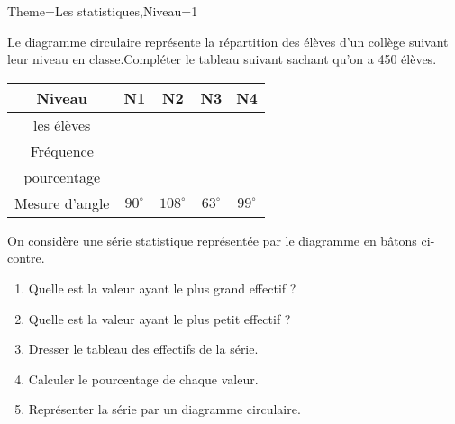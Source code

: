 \documentclass[a4paper,12pt]{article}
\begin{document}
\begin{Maquette}[Fiche]{Theme=Les statistiques,Niveau=1}
\begin{exercice}
\begin{minipage}{0.6\linewidth}
Le diagramme circulaire représente la répartition des élèves d'un collège suivant leur niveau en classe.Compléter le tableau suivant sachant qu'on a 450 élèves.

\begin{tabular}{|c|c|c|c|c|}
\hline 
Niveau & N1 & N2 & N3 & N4 \\ 
\hline 
les élèves &  &  &  &  \\ 
\hline 
Fréquence &  &  &  &  \\ 
\hline 
pourcentage &  &  &  &  \\ 
\hline 
Mesure d'angle & $90^{\circ}$ & $108^{\circ}$ & $63^{\circ}$ & $99^{\circ}$ \\ 
\hline 
\end{tabular} 
\end{minipage}%
\begin{minipage}{0.4\linewidth}
\end{minipage}
\end{exercice}


\begin{exercice}
\begin{minipage}{0.6\linewidth}
On considère une série statistique représentée par le diagramme en bâtons ci-contre.
\begin{enumerate}
\item Quelle est la valeur ayant le plus grand effectif ?
\item Quelle est la valeur ayant le plus petit effectif ?
\item Dresser le tableau des effectifs de la série.
\item Calculer le pourcentage de chaque valeur.
\item Représenter la série par un diagramme circulaire.
\end{enumerate}
\end{minipage}%
\begin{minipage}{0.4\linewidth}
\end{minipage}
\end{exercice}











\end{Maquette}
\end{document}
